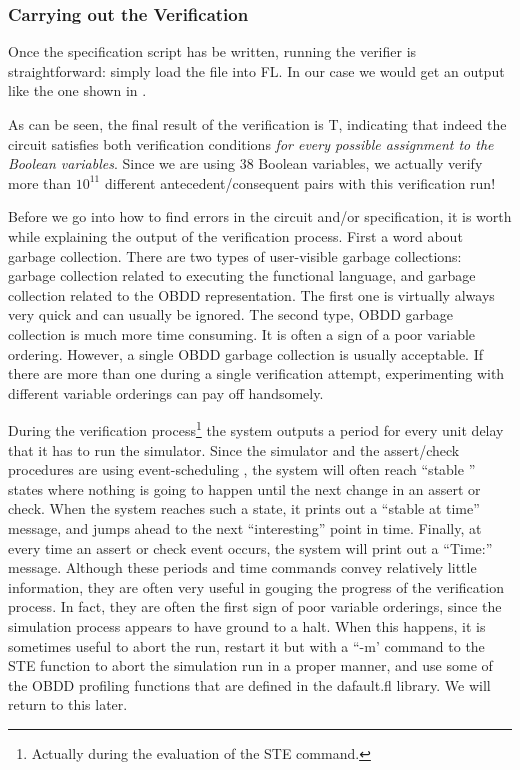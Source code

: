 \subsubsection{Carrying out the Verification}

Once the specification script has be written, running the
verifier is straightforward: simply load the file into FL.
In our case we would get an output like the one shown in .

As can be seen, the final result of the verification is T, indicating
that indeed the circuit satisfies both verification conditions {\em
for every possible assignment to the Boolean variables}.
Since we are using $38$ Boolean variables, we actually
verify more than $10^{11}$ different antecedent/consequent pairs
with this verification run!

Before we go into how to find errors in the circuit and/or specification, 
it is worth while explaining the output of the verification process.
First a word about garbage collection.
There are two types of user-visible garbage collections: garbage collection
related to executing the functional language, and garbage collection
related to the OBDD representation.
The first one is virtually always very quick and can usually be ignored.
The second type, OBDD garbage collection is much more time consuming.
It is often a sign of a poor variable ordering.
However, a single OBDD garbage collection is usually acceptable.
If there are more than one during a single verification attempt, experimenting
with different variable orderings can pay off handsomely.

During the verification process\footnote{Actually during
the evaluation of the STE command.} the system outputs a period for
every unit delay that it has to run the simulator.
Since the simulator and the assert/check procedures are using event-scheduling%
%
{},
the system will often reach ``stable%
%
{}'' states where nothing is going to happen
until the next change in an assert or check.
When the system reaches such a state, it prints out a ``stable at time''
message, and jumps ahead to the next ``interesting'' point in time.
Finally, at every time an assert or check event occurs, the system
will print out a ``Time:'' message.
Although these periods and time commands convey relatively little
information, they are often very useful in gouging the progress of
the verification process. In fact, they are often the first sign of
poor variable orderings, since the simulation process appears to have
ground to a halt.
When this happens, it is sometimes useful to abort the run, restart it
but with a ``-m' command to the STE function to abort the simulation
run in a proper manner, and use some of the OBDD profiling functions
that are defined in the dafault.fl library.
We will return to this later.

